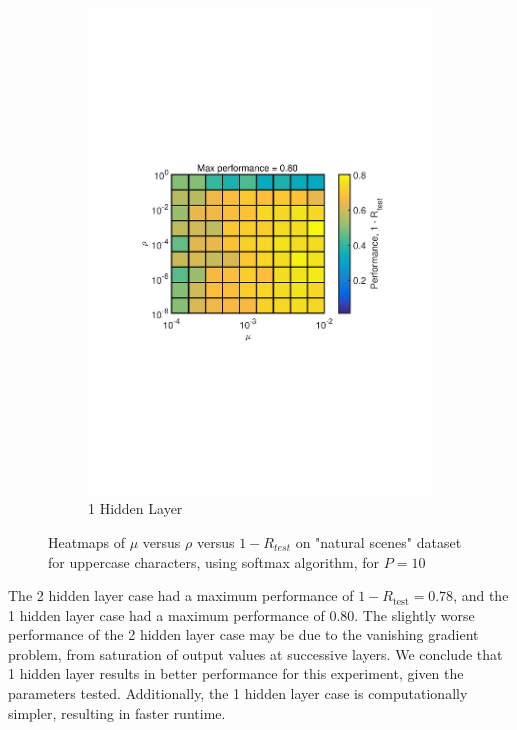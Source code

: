 \documentclass[journal,a4paper,onecolumn,11pt]{IEEEtran}
\begin{document}
\begin{figure}[!h]
\begin{subfigure}{.5\textwidth}
        \includegraphics[width=\textwidth]{para_opt_uppercasechar_sm.pdf}
  \caption{1 Hidden Layer}
  \label{fig:para_opt_uppercasechar_sm}
\end{subfigure}
\caption{Heatmaps of $\mu$ versus $\rho$ versus $1-R_{test}$ on "natural scenes" dataset for uppercase characters, using softmax algorithm, for $P=10$}
    \label{fig:hidden_layer_opt}
\end{figure}
The 2 hidden layer case had a maximum performance of $1-R_{\text{test}}=0.78$, and the 1 hidden layer case had a maximum performance of $0.80$. The slightly worse performance of the 2 hidden layer case may be due to the vanishing gradient problem, from saturation of output values at successive layers. We conclude that 1 hidden layer results in better performance for this experiment, given the parameters tested. Additionally, the 1 hidden layer case is computationally simpler, resulting in faster runtime. 
\end{document}
